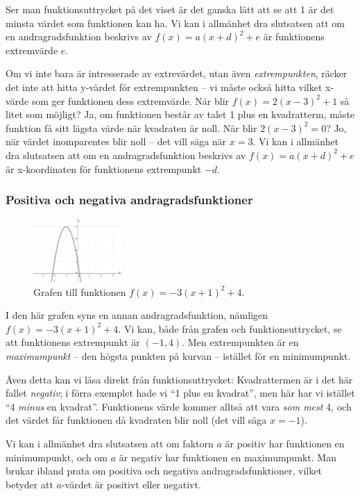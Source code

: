 Ser man funktionsuttrycket på det viset är det ganska lätt att se att 1 är det minsta värdet som funktionen kan ha.
Vi kan i allmänhet dra slutsatsen att om en andragradsfunktion beskrivs av $f(x)=a(x+d)^2+e$ är funktionens extremvärde $e$.

Om vi inte bara är intresserade av extrevärdet, utan även \emph{extrempunkten}, räcker det inte att hitta y-värdet för extrempunkten -- vi måste också hitta vilket x-värde som ger funktionen dess extremvärde.
När blir $f(x) = 2(x-3)^2+1$ så litet som möjligt?
Ja, om funktionen består av talet 1 plus en kvadratterm, måste funktion få sitt lägsta värde när kvadraten är noll.
När blir $2(x-3)^2 = 0$? Jo, när värdet inomparentes blir noll -- det vill säga när $x = 3$.
Vi kan i allmänhet dra slutsatsen att om en andragradsfunktion beskrivs av $f(x)=a(x+d)^2+e$ är x-koordinaten för funktionens extrempunkt $-d$.

\subsubsection{Positiva och negativa andragradsfunktioner}

\begin{figure}
  \centering
  \includegraphics[width=0.3\textwidth]{bilder/negkurva1.png}
  \caption{\label{fig:negkurva1}Grafen till funktionen $f(x)=-3(x+1)^2+4$.}
\end{figure}

I den här grafen syns en annan andragradsfunktion, nämligen $f(x)=-3(x+1)^2+4$.
Vi kan, både från grafen och funktionsuttrycket, se att funktionens extrempunkt är $(-1, 4)$.
Men extrempunkten är en \emph{maximumpunkt} -- den högsta punkten på kurvan -- istället för en minimumpunkt.

Även detta kan vi läsa direkt från funktionsuttrycket:
Kvadrattermen är i det här fallet \emph{negativ}; i förra exemplet hade vi ``1 plus en kvadrat'', men här har vi istället ``4 \emph{minus} en kvadrat''.
Funktionens värde kommer alltså att vara \emph{som mest} 4, och det värdet får funktionen då kvadraten blir noll (det vill säga $x=-1$).

Vi kan i allmänhet dra slutsatsen att om faktorn $a$ är positiv har funktionen en minimumpunkt, och om $a$ är negativ har funktionen en maximumpunkt.
Man brukar ibland prata om positiva och negativa andragradsfunktioner, vilket betyder att $a$-värdet är positivt eller negativt.

